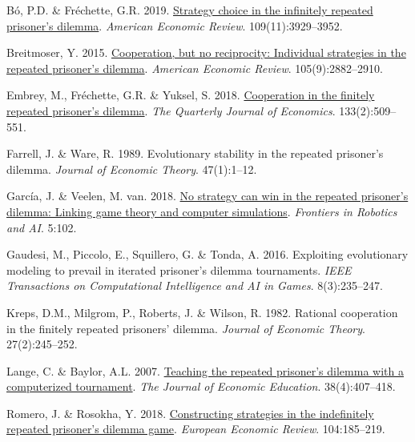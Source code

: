 \documentclass[11pt,preprint]{elsarticle}
\numberwithin{equation}{section}
\numberwithin{figure}{section}
\numberwithin{table}{section}
\newlength{\cslhangindent}
\newenvironment{CSLReferences}[2] %
{\begin{list}{}{%
	\setlength{\itemindent}{0pt}
	\setlength{\leftmargin}{0pt}
	\setlength{\parsep}{0pt}
	\ifodd #1
	\setlength{\leftmargin}{\cslhangindent}
	\setlength{\itemindent}{-1\cslhangindent}
	\fi
	\setlength{\itemsep}{#2\baselineskip}}}
{\end{list}}
\begin{document}
\label{refs}
\begin{CSLReferences}{1}{1}
Bó, P.D. \& Fréchette, G.R. 2019.
\href{https://doi.org/10.1257/aer.20181480}{Strategy choice in the
infinitely repeated prisoner's dilemma}. \emph{American Economic
Review}. 109(11):3929--3952.

Breitmoser, Y. 2015.
\href{https://doi.org/10.1257/aer.20130675}{Cooperation, but no
reciprocity: Individual strategies in the repeated prisoner's dilemma}.
\emph{American Economic Review}. 105(9):2882--2910.

Embrey, M., Fréchette, G.R. \& Yuksel, S. 2018.
\href{https://doi.org/10.1093/qje/qjx033}{Cooperation in the finitely
repeated prisoner's dilemma}. \emph{The Quarterly Journal of Economics}.
133(2):509--551.

Farrell, J. \& Ware, R. 1989. Evolutionary stability in the repeated
prisoner's dilemma. \emph{Journal of Economic Theory}. 47(1):1--12.

García, J. \& Veelen, M. van. 2018.
\href{https://doi.org/10.3389/frobt.2018.00102}{No strategy can win in
the repeated prisoner's dilemma: Linking game theory and computer
simulations}. \emph{Frontiers in Robotics and AI}. 5:102.

Gaudesi, M., Piccolo, E., Squillero, G. \& Tonda, A. 2016. Exploiting
evolutionary modeling to prevail in iterated prisoner's dilemma
tournaments. \emph{IEEE Transactions on Computational Intelligence and
AI in Games}. 8(3):235--247.

Kreps, D.M., Milgrom, P., Roberts, J. \& Wilson, R. 1982. Rational
cooperation in the finitely repeated prisoners' dilemma. \emph{Journal
of Economic Theory}. 27(2):245--252.

Lange, C. \& Baylor, A.L. 2007.
\href{https://doi.org/10.3200/JECE.38.4.407-418}{Teaching the repeated
prisoner's dilemma with a computerized tournament}. \emph{The Journal of
Economic Education}. 38(4):407--418.

Romero, J. \& Rosokha, Y. 2018.
\href{https://doi.org/10.1016/j.euroecorev.2018.02.008}{Constructing
strategies in the indefinitely repeated prisoner's dilemma game}.
\emph{European Economic Review}. 104:185--219.

\end{CSLReferences}


\end{document}
